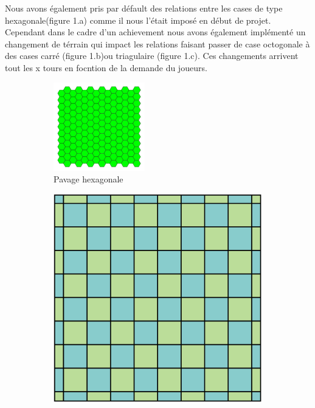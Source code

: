 \documentclass[10pt,a4paper,oneside]{report}
\begin{document}
        
        Nous avons également pris par défault des relations entre les cases de type hexagonale(figure 1.a) comme il nous l'était imposé en début de projet. Cependant dans le cadre d'un achievement nous avons également implémenté un changement de térrain qui impact les relations faisant passer de case octogonale à des cases carré (figure 1.b)ou triagulaire (figure 1.c). Ces changements arrivent tout les x tours en focntion de la demande du joueurs.
\begin{figure}[htbp]
\centering
\begin{subfigure}{0.3\textwidth}
\centering
\includegraphics[width=\textwidth]{plateauhexa.png}
\caption{Pavage hexagonale}
\label{label_de_l_image_1}
\end{subfigure}
\quad
\begin{subfigure}{0.3\textwidth}
\centering
\includegraphics[width=\textwidth]{quadrillage.png}

\end{subfigure}
\end{figure}
\end{document}
